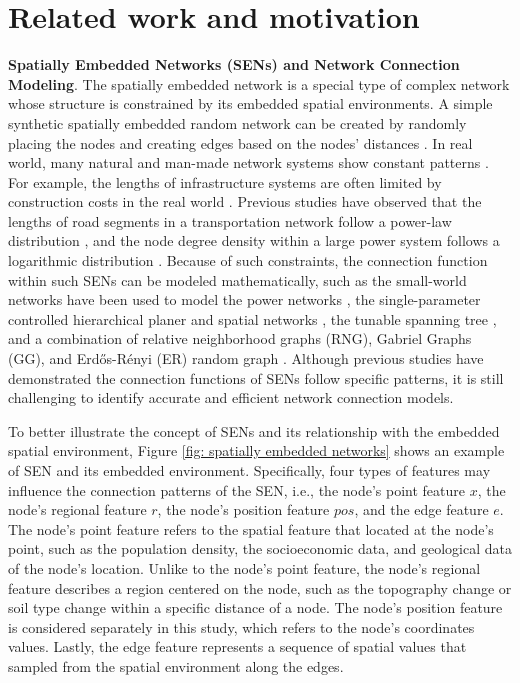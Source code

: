 \section{Related work and motivation}
\textbf{Spatially Embedded Networks (SENs) and Network Connection Modeling}. The
spatially embedded network is a special type of complex network whose structure
is constrained by its embedded spatial environments. A simple synthetic
spatially embedded random network can be created by randomly placing the nodes
and creating edges based on the nodes' distances \cite{Barnett2007Spatially}. In
real world, many natural and man-made network systems show constant patterns
\cite{Dong2020networknetworks}. For example, the lengths of infrastructure
systems are often limited by construction costs in the real world
\cite{Cadini2015cascading}. Previous studies have observed that the lengths of
road segments in a transportation network follow a power-law distribution
\cite{Chen2019Correlations}, and the node degree density within a large power
system follows a logarithmic distribution \cite{Soltan2016Generation}. Because
of such constraints, the connection function within such SENs can be modeled
mathematically, such as the small-world networks have been used to model the
power networks \cite{Aksoy2019generative}, the single-parameter controlled
hierarchical planer and spatial networks \cite{Molinero2020model}, the tunable
spanning tree \cite{Dunton2023Generating}, and a combination of relative
neighborhood graphs (RNG), Gabriel Graphs (GG), and Erd\H{o}s-R\'enyi (ER)
random graph \cite{Hackl2019Modelling}.  Although previous studies have
demonstrated the connection functions of SENs follow specific patterns, it is
still challenging to identify accurate and efficient network connection models.

To better illustrate the concept of SENs and its relationship with the embedded
spatial environment, Figure \ref*{fig: spatially embedded networks} shows an
example of SEN and its embedded environment. Specifically, four types of
features may influence the connection patterns of the SEN, i.e., the node's
point feature $x$, the node's regional feature $r$, the node's position feature
$pos$, and the edge feature $e$. The node's point feature refers to the spatial
feature that located at the node's point, such as the population density, the
socioeconomic data, and geological data of the node's location. Unlike to the
node's point feature, the node's regional feature describes a region centered on
the node, such as the topography change or soil type change within a specific
distance of a node. The node's position feature is considered separately in this
study, which refers to the node's coordinates values. Lastly, the edge feature
represents a sequence of spatial values that sampled from the spatial
environment along the edges.


